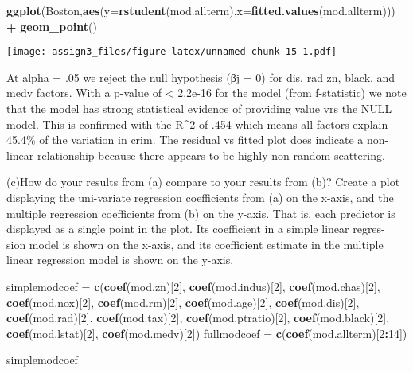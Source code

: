 \documentclass[]{article}
\newenvironment{Shaded}{\begin{snugshade}}{\end{snugshade}}
\newcommand{\DataTypeTok}[1]{\textcolor[rgb]{0.13,0.29,0.53}{#1}}
\newcommand{\DecValTok}[1]{\textcolor[rgb]{0.00,0.00,0.81}{#1}}
\newcommand{\KeywordTok}[1]{\textcolor[rgb]{0.13,0.29,0.53}{\textbf{#1}}}
\newcommand{\NormalTok}[1]{#1}
\newcommand{\OperatorTok}[1]{\textcolor[rgb]{0.81,0.36,0.00}{\textbf{#1}}}
\newcommand{\StringTok}[1]{\textcolor[rgb]{0.31,0.60,0.02}{#1}}
\begin{document}
\begin{Shaded}
\begin{Highlighting}[]
\KeywordTok{ggplot}\NormalTok{(Boston,}\KeywordTok{aes}\NormalTok{(}\DataTypeTok{y=}\KeywordTok{rstudent}\NormalTok{(mod.allterm),}\DataTypeTok{x=}\KeywordTok{fitted.values}\NormalTok{(mod.allterm))) }\OperatorTok{+}\StringTok{ }\KeywordTok{geom_point}\NormalTok{() }
\end{Highlighting}
\end{Shaded}

\texttt{[image: assign3\_files/figure-latex/unnamed-chunk-15-1.pdf]}

At alpha = .05 we reject the null hypothesis (βj = 0) for dis, rad zn,
black, and medv factors. With a p-value of \textless{} 2.2e-16 for the
model (from f-statistic) we note that the model has strong statistical
evidence of providing value vrs the NULL model. This is confirmed with
the R\^{}2 of .454 which means all factors explain 45.4\% of the
variation in crim. The residual vs fitted plot does indicate a
non-linear relationship because there appears to be highly non-random
scattering.

(c)How do your results from (a) compare to your results from (b)? Create
a plot displaying the uni-variate regression coefficients from (a) on
the x-axis, and the multiple regression coefficients from (b) on the
y-axis. That is, each predictor is displayed as a single point in the
plot. Its coefficient in a simple linear regres- sion model is shown on
the x-axis, and its coefficient estimate in the multiple linear
regression model is shown on the y-axis.

\begin{Shaded}
\begin{Highlighting}[]
\NormalTok{simplemodcoef =}\StringTok{ }\KeywordTok{c}\NormalTok{(}\KeywordTok{coef}\NormalTok{(mod.zn)[}\DecValTok{2}\NormalTok{],}
      \KeywordTok{coef}\NormalTok{(mod.indus)[}\DecValTok{2}\NormalTok{],}
      \KeywordTok{coef}\NormalTok{(mod.chas)[}\DecValTok{2}\NormalTok{],}
      \KeywordTok{coef}\NormalTok{(mod.nox)[}\DecValTok{2}\NormalTok{],}
      \KeywordTok{coef}\NormalTok{(mod.rm)[}\DecValTok{2}\NormalTok{],}
      \KeywordTok{coef}\NormalTok{(mod.age)[}\DecValTok{2}\NormalTok{],}
      \KeywordTok{coef}\NormalTok{(mod.dis)[}\DecValTok{2}\NormalTok{],}
      \KeywordTok{coef}\NormalTok{(mod.rad)[}\DecValTok{2}\NormalTok{],}
      \KeywordTok{coef}\NormalTok{(mod.tax)[}\DecValTok{2}\NormalTok{],}
      \KeywordTok{coef}\NormalTok{(mod.ptratio)[}\DecValTok{2}\NormalTok{],}
      \KeywordTok{coef}\NormalTok{(mod.black)[}\DecValTok{2}\NormalTok{],}
      \KeywordTok{coef}\NormalTok{(mod.lstat)[}\DecValTok{2}\NormalTok{],}
      \KeywordTok{coef}\NormalTok{(mod.medv)[}\DecValTok{2}\NormalTok{])}
\NormalTok{fullmodcoef =}\StringTok{ }\KeywordTok{c}\NormalTok{(}\KeywordTok{coef}\NormalTok{(mod.allterm)[}\DecValTok{2}\OperatorTok{:}\DecValTok{14}\NormalTok{])}

\NormalTok{simplemodcoef}
\end{Highlighting}
\end{Shaded}
\end{document}
